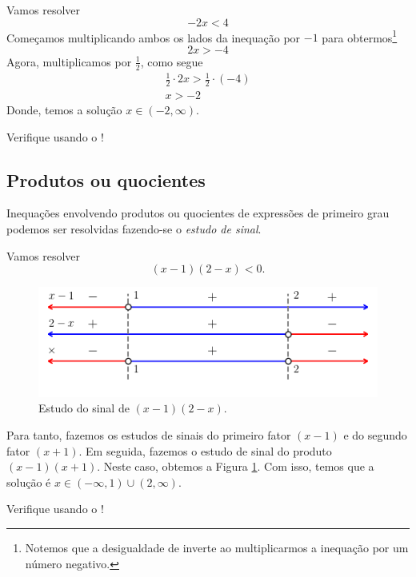 \begin{ex}
  Vamos resolver
  \begin{equation}
    - 2x < 4
  \end{equation}
  Começamos multiplicando ambos os lados da inequação por $-1$ para obtermos\footnote{Notemos que a desigualdade de inverte ao multiplicarmos a inequação por um número negativo.}
  \begin{equation}
    2x > -4
  \end{equation}
  Agora, multiplicamos por $\frac{1}{2}$, como segue
  \begin{gather}
    \frac{1}{2}\cdot 2x > \frac{1}{2}\cdot (-4)\\
    x > -2
  \end{gather}
  Donde, temos a solução $x\in (-2, \infty)$.

  \begin{ifispython}
    Verifique usando o {\sympy}!
  \end{ifispython}
\end{ex}

\subsection{Produtos ou quocientes}

Inequações envolvendo produtos ou quocientes de expressões de primeiro grau podemos ser resolvidas fazendo-se o \emph{estudo de sinal}.

\begin{ex}
  Vamos resolver
  \begin{equation}
    (x - 1)(2 - x) < 0.
  \end{equation}
  
  \begin{figure}[H]
    \centering
    \includegraphics{./cap_ineq/dados/fig_ex_ineq_pg1/fig}
    \caption{Estudo do sinal de $(x-1)(2-x)$.}
    \label{fig:ex_ineq_pg1}
  \end{figure}  

  Para tanto, fazemos os estudos de sinais do primeiro fator $(x-1)$ e do segundo fator $(x+1)$. Em seguida, fazemos o estudo de sinal do produto $(x-1)(x+1)$. Neste caso, obtemos a Figura \ref{fig:ex_ineq_pg1}. Com isso, temos que a solução é $x\in (-\infty, 1)\cup (2, \infty)$.

  \begin{ifispython}
    Verifique usando o {\sympy}!
  \end{ifispython}
\end{ex}

